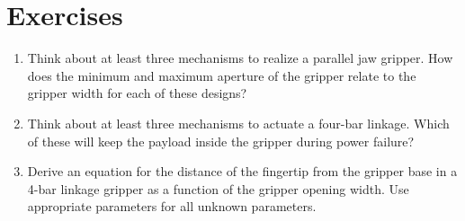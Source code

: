 \section{Exercises}
\begin{enumerate}
\item Think about at least three mechanisms to realize a parallel jaw gripper. How does the minimum and maximum aperture of the gripper relate to the gripper width for each of these designs?
\item Think about at least three mechanisms to actuate a four-bar linkage. Which of these will keep the payload inside the gripper during power failure?
\item Derive an equation for the distance of the fingertip from the gripper base in a 4-bar linkage gripper as a function of the gripper opening width. Use appropriate parameters for all unknown parameters. 
\end{enumerate}